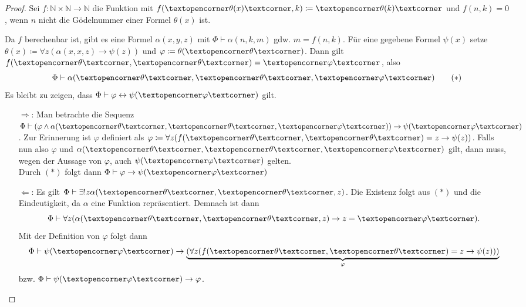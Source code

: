 \begin{proof}
	Sei $f:\mathbb{N}\times\mathbb{N}\to \mathbb{N}$ die Funktion mit $f(\opencorner\theta(x)\closecorner, k)\coloneqq\opencorner\theta(k)\closecorner$ und $f(n,k)=0$, wenn $n$ nicht die Gödelnummer einer Formel $\theta(x)$ ist.
	
	Da $f$ berechenbar ist, gibt es eine Formel $\alpha(x,y,z)$ mit $\Phi\vdash\alpha(n,k,m)$ gdw. $m=f(n,k)$.
	Für eine gegebene Formel $\psi(x)$ setze $\theta(x)\coloneqq\forall z (\alpha(x,x,z)\rightarrow\psi(z))$ und $\varphi\coloneqq\theta(\opencorner\theta\closecorner)$.
	Dann gilt $f(\opencorner\theta\closecorner,\opencorner\theta\closecorner)=\opencorner\varphi\closecorner$, also 
	\[
	\Phi\vdash\alpha(\opencorner\theta\closecorner,\opencorner\theta\closecorner,\opencorner\varphi\closecorner) \tag*{$(\ast)$}
	\]
	Es bleibt zu zeigen, dass $\Phi\vdash\varphi \leftrightarrow \psi(\opencorner\varphi\closecorner)$ gilt.
	\begin{itemize}
		\item[$\Rightarrow$:] Man betrachte die Sequenz $\Phi\vdash(\varphi\land\alpha(\opencorner\theta\closecorner,\opencorner\theta\closecorner,\opencorner\varphi\closecorner))\rightarrow\psi(\opencorner\varphi\closecorner)$. 
		Zur Erinnerung ist $\varphi$ definiert als $\varphi\coloneqq\forall z (f(\opencorner\theta\closecorner,\opencorner\theta\closecorner)=z\rightarrow\psi(z))$. 
		Falls nun also $\varphi$ und $\alpha(\opencorner\theta\closecorner,\opencorner\theta\closecorner,\opencorner\varphi\closecorner)$ gilt, dann muss, wegen der Aussage von $\varphi$, auch $\psi(\opencorner\varphi\closecorner)$ gelten.
		\\
		Durch $(\ast)$ folgt dann $\Phi\vdash\varphi\rightarrow\psi(\opencorner\varphi\closecorner)$
		
		\item[$\Leftarrow$:] Es gilt $\Phi\vdash \exists!z \alpha(\opencorner\theta\closecorner, \opencorner\theta\closecorner, z)$. Die Existenz folgt aus $(\ast)$ und die Eindeutigkeit, da $\alpha$ eine Funktion repräsentiert. Demnach ist dann
		\[\Phi\vdash\forall z (\alpha(\opencorner\theta\closecorner, \opencorner\theta\closecorner, z)\rightarrow z=\opencorner\varphi\closecorner).\] Mit der Definition von $\varphi$ folgt dann \[\Phi\vdash\psi(\opencorner\varphi\closecorner)\rightarrow\underbrace{(\forall z (f(\opencorner\theta\closecorner,\opencorner\theta\closecorner)=z\rightarrow\psi(z)))}_\varphi\] bzw. $\Phi\vdash\psi(\opencorner\varphi\closecorner)\rightarrow\varphi$.
	\end{itemize}
\end{proof}

